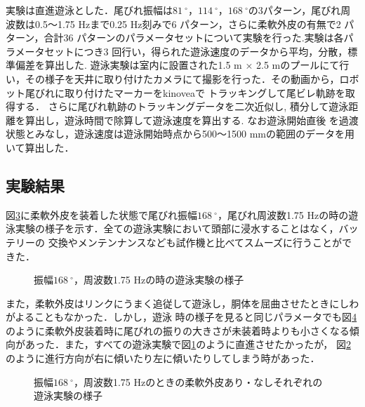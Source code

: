 実験は直進遊泳とした．尾びれ振幅は$81\:^\circ$，$114\:^\circ$，$168\:^\circ$の3パターン，尾びれ周波数は0.5～1.75 Hzまで0.25 Hz刻みで6 パターン，さらに柔軟外皮の有無で2 パターン，合計36 
パターンのパラメータセットについて実験を行った.実験は各パラメータセットにつき3 回行い，得られた遊泳速度のデータから平均，分散，標準偏差を算出した.
遊泳実験は室内に設置された1.5 m × 2.5 mのプールにて行い，その様子を天井に取り付けたカメラにて撮影を行った．その動画から，ロボット尾びれに取り付けたマーカーをkinoveaで
トラッキングして尾ビレ軌跡を取得する．
さらに尾びれ軌跡のトラッキングデータを二次近似し, 積分して遊泳距離を算出し，遊泳時間で除算して遊泳速度を算出する. なお遊泳開始直後
を過渡状態とみなし，遊泳速度は遊泳開始時点から500～1500 mmの範囲のデータを用いて算出した．

\subsection{実験結果}
図\ref{fig:test_swim}に柔軟外皮を装着した状態で尾びれ振幅$168\:^\circ$，尾びれ周波数1.75 Hzの時の遊泳実験の様子を示す．全ての遊泳実験において頭部に浸水することはなく，バッテリーの
交換やメンテンナンスなども試作機と比べてスムーズに行うことができた．
\begin{figure}[htbp]
   \centering  
   \begin{subfigure}[b]{1\linewidth}
       \centering
       \label{fig:str}
   \end{subfigure}
   \begin{subfigure}[b]{1\linewidth}
       \centering
       \label{fig:right}
   \end{subfigure}
   \caption{振幅$168\:^\circ$，周波数1.75 Hzの時の遊泳実験の様子}
   \label{fig:test_swim}
\end{figure}
また，柔軟外皮はリンクにうまく追従して遊泳し，胴体を屈曲させたときにしわがよることもなかった．しかし，遊泳
時の様子を見ると同じパラメータでも図\ref{fig:kukkyoku}のように柔軟外皮装着時に尾びれの振りの大きさが未装着時よりも小さくなる傾向があった．また，すべての遊泳実験で図\ref{fig:str}のように直進させたかったが，
図\ref{fig:right}のように進行方向が右に傾いたり左に傾いたりしてしまう時があった．

\begin{figure}[t]
    \centering
    \caption{振幅$168\:^\circ$，周波数1.75 Hzのときの柔軟外皮あり・なしそれぞれの遊泳実験の様子}
    \label{fig:kukkyoku}
\end{figure}


